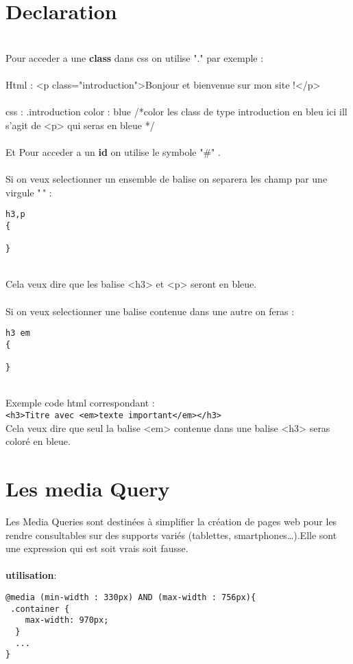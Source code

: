\documentclass[a4paper,12pt]{book}
\begin{document}
\section{Declaration}
\\
Pour acceder a une \textbf{class} dans css on utilise "." par exemple :\\
\\
Html : <p class="introduction">Bonjour et bienvenue sur mon site !</p>\\
\\
css : .introduction{ color : blue } /*color les class de type introduction en bleu ici ill s'agit de <p> qui seras en bleue */\\
\\
Et Pour acceder a un \textbf{id} on utilise le symbole "#" .\\ 
\\
Si on veux selectionner un ensemble de balise on separera les champ par une virgule "\," :\\
\begin{DDbox}{\linewidth}
\begin{lstlisting}
h3,p
{

}
\end{lstlisting}
\end{DDbox}{\linewidth}
\\
Cela veux dire que les balise <h3> et <p> seront en bleue.\\
\\
Si on veux selectionner une balise contenue dans une autre on feras :\\
\begin{DDbox}{\linewidth}
\begin{lstlisting}
h3 em
{

}
\end{lstlisting}
\end{DDbox}{\linewidth}
\\
Exemple code html correspondant :\\
\verb+<h3>Titre avec <em>texte important</em></h3>+
\\
Cela veux dire que seul la balise <em> contenue dans une balise <h3> seras coloré en bleue.
\\


\section{Les media Query}
Les Media Queries sont destinées à simplifier la création de pages web pour les rendre consultables sur des supports variés (tablettes, smartphones…).Elle sont une expression qui est soit vrais soit fausse.\\
\\
\textbf{utilisation}:\\
\begin{DDbox}{\linewidth}
\begin{lstlisting}
@media (min-width : 330px) AND (max-width : 756px){
 .container {
    max-width: 970px;
  }
  ...
}
\end{lstlisting}
\end{DDbox}{\linewidth}
\end{document}
